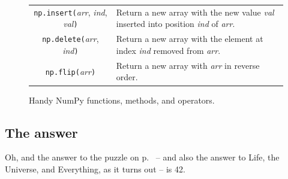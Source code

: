\begin{figure}[ht]
\begin{tabular}{c|p{3.1in}}
\texttt{np.insert(}\textsl{arr}, \textsl{ind}, \textsl{val}\texttt{)} &
    Return a new array with the new value \textsl{val} inserted into position \textsl{ind} of \textsl{arr}. \\

\texttt{np.delete(}\textsl{arr}, \textsl{ind}\texttt{)} &
    Return a new array with the element at index \textsl{ind} removed from \textsl{arr}. \\

\texttt{np.flip(}\textsl{arr}\texttt{)} &
    Return a new array with \textsl{arr} in reverse order. \\
\end{tabular}\par
\endgroup
\bigskip
\caption{Handy NumPy functions, methods, and operators.}
\label{fig:handyNumPy}
\end{figure}

\vfill
\subsection{The answer}

Oh, and the answer to the puzzle on p.~\pageref{indexTest} -- and also the
answer to Life, the Universe, and Everything, as it turns out -- is 42.

